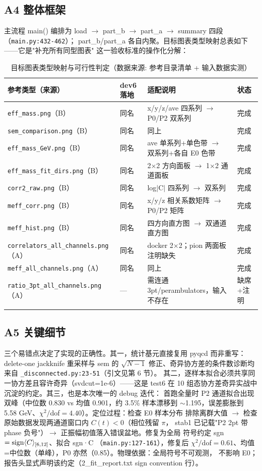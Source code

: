 \documentclass[UTF8]{ctexart}
\begin{document}
\subsection{A4 整体框架}
主流程 main() 编排为 load $\rightarrow$ part\_b $\rightarrow$ part\_a $\rightarrow$
summary 四段（\textcolor{evidence}{\texttt{\nolinkurl{main.py:432-462}}}）；
part\_b/part\_a 各自内聚。目标图表类型映射总表如下——它是"补充所有同型图表"
这一验收标准的操作化分解：
\begin{xltabular}{\textwidth}{p{4.7cm}p{1.8cm}p{3.2cm}X}
\toprule
参考类型（来源） & dev6 落地 & 适配说明 & 状态 \\
\midrule
\endhead
\texttt{\nolinkurl{eff_mass.png}}（B）& 同名 & x/y/z/ave 四系列 $\to$ P0/P2 双系列 & 完成 \\
\texttt{\nolinkurl{sem_comparison.png}}（B）& 同名 & 同上 & 完成 \\
\texttt{\nolinkurl{eff_mass_GeV.png}}（B）& 同名 & ave 单系列+单色带 $\to$ 双系列+各自 E0 色带 & 完成 \\
\texttt{\nolinkurl{eff_mass_fit_dirs.png}}（B）& 同名 & 2$\times$2 方向面板 $\to$ 1$\times$2 通道面板 & 完成 \\
\texttt{\nolinkurl{corr2_raw.png}}（B）& 同名 & log$|$C$|$ 四系列 $\to$ 双系列 & 完成 \\
\texttt{\nolinkurl{meff_corr.png}}（B）& 同名 & x/y/z 相关系数矩阵 $\to$ P0/P2 矩阵 & 完成 \\
\texttt{\nolinkurl{meff_hist.png}}（B）& 同名 & 四方向直方图 $\to$ 双通道直方图 & 完成 \\
\texttt{\nolinkurl{correlators_all_channels.png}}（A）& 同名 & docker 2$\times$2；pion 两面板注明缺失 & 完成 \\
\texttt{\nolinkurl{meff_all_channels.png}}（A）& 同名 & 同上 & 完成 \\
\texttt{\nolinkurl{ratio_3pt_all_channels.png}}（A）& --- & 需连通 3pt/perambulators，输入不存在 & 缺席+注明 \\
\bottomrule
\caption{目标图表类型映射与可行性判定（数据来源: 参考目录清单 + 输入数据实测）}
\end{xltabular}
\subsection{A5 关键细节}
三个易错点决定了实现的正确性。其一，统计基元直接复用 pyqcd 而非重写：
delete-one jackknife 重采样与 sem 的 $\sqrt{N-1}$ 修正、奇异协方差的条件数诊断均来自
\textcolor{evidence}{\texttt{\nolinkurl{_disconnected.py:23-51}}}（引文见第 6 节）。
其二，逐样本拟合必须共享同一协方差且容许奇异（svdcut=1e-6）——这是 test6 在
10 组态协方差奇异实战中沉淀的约定。其三，也是本次唯一的 debug 迭代：
首跑全量时 P2 通道拟合出现双峰（中位数 0.830 vs 均值 0.901，约 3.5\% 样本漂移到
$\sim$1.195，误差膨胀到 5.58 GeV、$\chi^2/$dof$=4.40$）。定位过程：检查 E0 样本分布
排除离群大值 $\rightarrow$ 检查原始数据发现两通道窗口内 $C(t)<0$（相位残留 $\pi$，
stab1 已记载"P2 2pt 带 phase 负号"）$\rightarrow$ 正振幅初值落入错误盆地。修复为全局
符号约定 sgn$={\rm sign}\langle C\rangle_{[6,12]}$、拟合 sgn·C
（\textcolor{evidence}{\texttt{\nolinkurl{main.py:127-161}}}），修复后
$\chi^2/$dof$=0.61$、均值=中位数（单峰），P0 亦然（0.85）。物理依据：全局符号不可观测，
不影响 E0；报告头显式声明该约定（2\_fit\_report.txt sign convention 行）。
\end{document}
